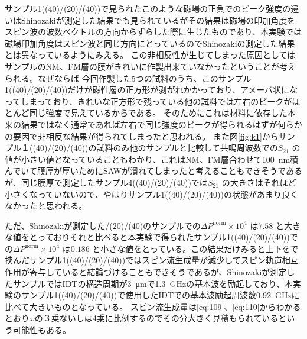 \documentclass[dvipdfmx,11pt]{jsreport}
\numberwithin{equation}{chapter}
\numberwithin{table}{chapter}
\begin{document}
サンプル1((40)/(20)/(40))で見られたこのような磁場の正負でのピーク強度の違いはShinozakiが測定した結果でも見られているがその結果は磁場の印加角度をスピン波の波数ベクトルの方向からずらした際に生じたものであり、本実験では磁場印加角度はスピン波と同じ方向にとっているのでShinozakiの測定した結果とは異なっているようにみえる\cite{shi}。
この非相反性が生じてしまった原因としてはサンプルのNM、FM層の膜がきれいに作製出来ていなかったということが考えられる。なぜならば
今回作製した5つの試料のうち、このサンプル1((40)/(20)/(40))だけが磁性層の正方形が剥がれかかっており、アメーバ状になってしまっており、きれいな正方形で残っている他の試料では左右のピークがほとんど同じ強度で見えているからである。
そのためにこれは材料に依存した本来の結果ではなく通常であれば左右で同じ強度のピークが得られるはずが何らかの要因で非相反な結果が得られてしまったと思われる。
また図\ref{fig:k1}からサンプル１((40)/(20)/(40))の試料のみ他のサンプルと比較して共鳴周波数での$S_{21}$ の値が小さい値となっていることもわかり、これはNM、FM層合わせて\SI{100}{\nano \metre}積んでいて膜厚が厚いためにSAWが潰れてしまったと考えることもできそうであるが、同じ膜厚で測定したサンプル4((40)/(20)/(40))では$S_{21}$ の大きさはそれほど小さくなっていないので、やはりサンプル1((40)/(20)/(40))の状態があまり良くなかったと思われる。

ただ、Shinozakiが測定した/(20)/(40)のサンプルでの$\Delta P^{\text{norm}}\times 10^{4}$ は$7.58$ と大きな値をとっておりそれと比べると本実験で得られたサンプル1((40)/(20)/(40))での$\Delta P^{\text{norm}}\times 10^{4}$ は$0.186$ と小さな値をとっている。この結果だけみると上下をで挟んだサンプル1((40)/(20)/(40))ではスピン流生成量が減少してスピン軌道相互作用が寄与していると結論づけることもできそうであるが、Shinozakiが測定したサンプルではIDTの構造周期が\SI{3}{\micro \metre}で\SI{1.3}{\giga \hertz}の基本波を励起しており、本実験のサンプル1((40)/(20)/(40))で使用したIDTでの基本波励起周波数\SI{0.92}{\giga \hertz}に比べて大きいものとなっている。
スピン流生成量は\eqref{eq:109}、\eqref{eq:110}からわかるとおり$\omega$の３乗ないしは4乗に比例するのでその分大きく見積もられているという可能性もある。
\end{document}
